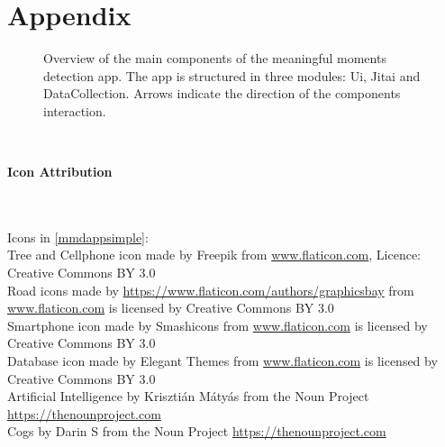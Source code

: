 \documentclass[a4paper]{report}
\newcounter{Feature}
\begin{document}
\newpage
\chapter{Appendix}
\begin{figure}[h]
  \vspace{-2cm}
  \caption{Overview of the main components of the meaningful moments detection app. The app is structured in three modules: Ui, Jitai and DataCollection. Arrows indicate the direction of the components interaction.\label{mmdapp}}
\end{figure}
\ \\
\begin{huge}
\textbf{Icon Attribution}
\end{huge}\\ \ \\
Icons in \autoref{mmdappsimple}:\\
Tree and Cellphone icon made by Freepik from \url{www.flaticon.com}, Licence: Creative Commons BY 3.0\\
Road  icons made by \url{https://www.flaticon.com/authors/graphicsbay} from \url{www.flaticon.com} is licensed by Creative Commons BY 3.0\\
Smartphone icon made by Smashicons from \url{www.flaticon.com} is licensed by Creative Commons BY 3.0\\
Database icon made by Elegant Themes from \url{www.flaticon.com} is licensed by Creative Commons BY 3.0\\
Artificial Intelligence by Krisztián Mátyás from the Noun Project \url{https://thenounproject.com}\\
Cogs by Darin S from the Noun Project \url{https://thenounproject.com}
\listoffigures
\listoftables
\printbibliography 
\end{document}
